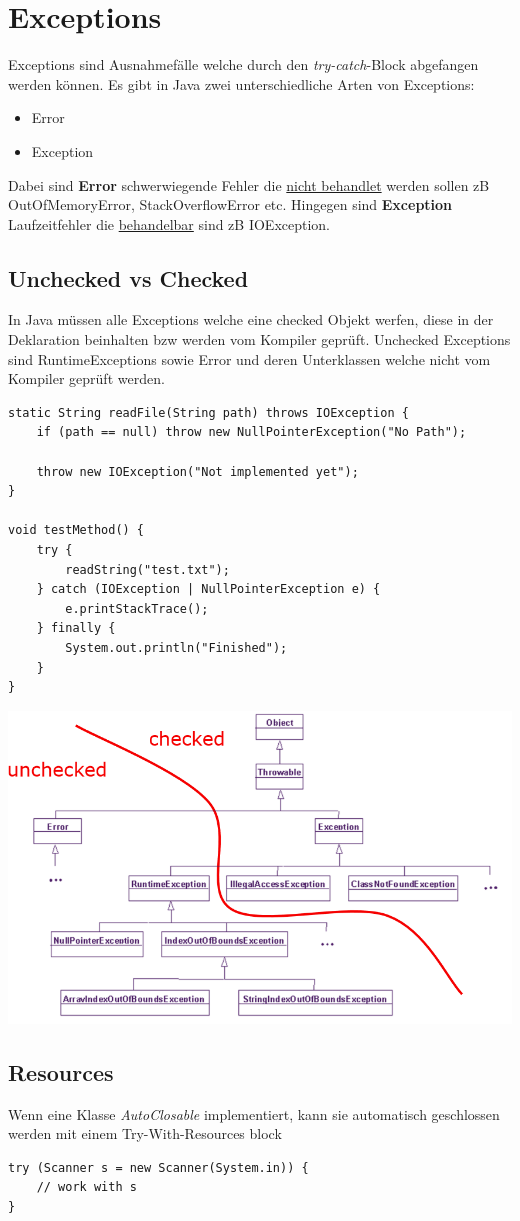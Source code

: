 \section{Exceptions}
Exceptions sind Ausnahmefälle welche durch den \textit{try-catch}-Block abgefangen werden können. Es gibt in Java zwei unterschiedliche Arten von Exceptions: 
\begin{itemize}[nosep]
	\item Error
	\item Exception
\end{itemize}

\noindent Dabei sind \textbf{Error} schwerwiegende Fehler die \underline{nicht behandlet} werden sollen zB OutOfMemoryError, StackOverflowError etc. Hingegen sind \textbf{Exception} Laufzeitfehler die \underline{behandelbar} sind zB IOException.


\subsection{Unchecked vs Checked}
In Java müssen alle Exceptions welche eine checked Objekt werfen, diese in der Deklaration beinhalten bzw werden vom Kompiler geprüft. Unchecked Exceptions sind RuntimeExceptions sowie Error und deren Unterklassen welche nicht vom Kompiler geprüft werden. 
\begin{lstlisting}
static String readFile(String path) throws IOException {
	if (path == null) throw new NullPointerException("No Path");
	
	throw new IOException("Not implemented yet");
}

void testMethod() {
	try {
		readString("test.txt");
	} catch (IOException | NullPointerException e) {
		e.printStackTrace();
	} finally {
		System.out.println("Finished");
	}
}
\end{lstlisting}
\begin{center}
	\includegraphics[width= 0.8\columnwidth]{Images/exception_uc}
\end{center}

\subsection{Resources}
Wenn eine Klasse \textit{AutoClosable} implementiert, kann sie automatisch geschlossen werden mit einem Try-With-Resources block
\begin{lstlisting}
try (Scanner s = new Scanner(System.in)) {
	// work with s
}
\end{lstlisting}
